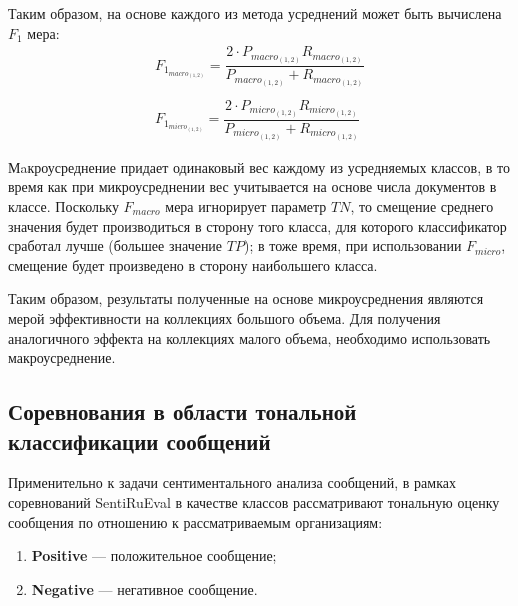     Таким образом, на основе каждого из метода усреднений может быть вычислена
    $F_1$ мера:
    \begin{gather*}
        F_{1_{macro_{(1,2)}}} = \dfrac{2 \cdot P_{macro_{(1,2)}} R_{macro_{(1,2)}} }{P_{macro_{(1,2)}} + R_{macro_{(1,2)}}} \nonumber \\
        \\
        F_{1_{micro_{(1,2)}}} = \dfrac{2 \cdot P_{micro_{(1,2)}} R_{micro_{(1,2)}} }{P_{micro_{(1,2)}} + R_{micro_{(1,2)}}} \nonumber
    \end{gather*}


    Мaкроусреднение придает одинаковый вес каждому из усредняемых классов, в то
    время как при микроусреднении вес учитывается на основе числа документов в
    классе. Поскольку $F_{macro}$ мера игнорирует параметр $TN$, то смещение
    среднего значения будет производиться в сторону того класса, для которого классификатор сработал
    лучше (большее значение $TP$); в тоже время, при использовании $F_{micro}$,
    смещение будет произведено в сторону наибольшего класса. \cite{microMacroMeasures}

    Таким образом, результаты полученные на основе микроусреднения являются мерой
    эффективности на коллекциях большого объема. Для получения аналогичного эффекта
    на коллекциях малого объема, необходимо использовать макроусреднение. \cite{microMacroMeasuresDifferences}

    \subsection{Соревнования в области тональной классификации сообщений}


    Применительно к задачи сентиментального анализа сообщений, в рамках соревнований
    SentiRuEval в качестве классов рассматривают тональную оценку сообщения по
    отношению к рассматриваемым организациям:
    \begin{enumerate}
        \item {\bf Positive} --- положительное сообщение;
        \item {\bf Negative} --- негативное сообщение.
    \end{enumerate}


